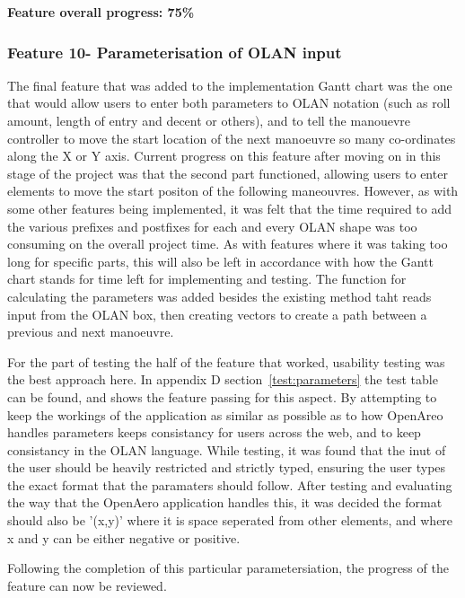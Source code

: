 \textbf{Feature overall progress: 75\%}

\subsubsection{Feature 10- Parameterisation of OLAN input}
The final feature that was added to the implementation Gantt chart was the one that would allow users to enter both parameters to OLAN notation (such as roll amount, length of entry and decent or others), and to tell the manouevre controller to move the start location of the next manoeuvre so many co-ordinates along the X or Y axis. Current progress on this feature after moving on in this stage of the project was that the second part functioned, allowing users to enter elements to move the start positon of the following maneouvres. However, as with some other features being implemented, it was felt that the time required to add the various prefixes and postfixes for each and every OLAN shape was too consuming on the overall project time. As with features where it was taking too long for specific parts, this will also be left in accordance with how the Gantt chart stands for time left for implementing and testing. The function for calculating the parameters was added besides the existing method taht reads input from the OLAN box, then creating vectors to create a path between a previous and next manoeuvre.

For the part of testing the half of the feature that worked, usability testing was the best approach here. In appendix D section~\ref{test:parameters} the test table can be found, and shows the feature passing for this aspect. By attempting to keep the workings of the application as similar as possible as to how OpenAreo handles parameters keeps consistancy for users across the web, and to keep consistancy in the OLAN language. While testing, it was found that the inut of the user should be heavily restricted and strictly typed, ensuring the user types the exact format that the paramaters should follow. After testing and evaluating the way that the OpenAero application handles this, it was decided the format should also be '(x,y)' where it is space seperated from other elements, and where x and y can be either negative or positive.

Following the completion of this particular parametersiation, the progress of the feature can now be reviewed.

